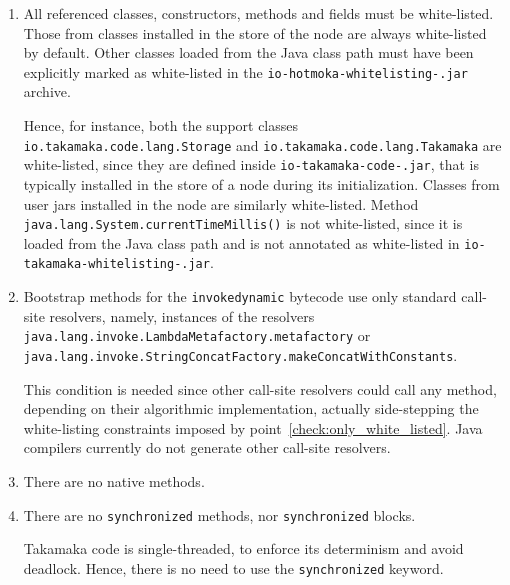 \begin{enumerate}
\begin{commentbox}
that occurs once at its start-up, it is however permitted to install the
runtime of Takamaka (the \texttt{io-takamaka-code-\takamakaVersion{}.jar} archive used in the examples
in the previous chapters).
\end{commentbox}
%
\item\label{check:only_white_listed} All referenced classes, constructors, methods and fields must be
	white-listed.
    Those from classes installed in the store of the node are always white-listed by
    default. Other classes loaded from the Java class path must have been explicitly
    marked as white-listed in the \texttt{io-hotmoka-whitelisting-\hotmokaVersion{}.jar} archive.
%
\begin{commentbox}
Hence, for instance, both the support classes \texttt{io.takamaka.code.lang.Storage}
and \texttt{io.takamaka.code.lang.Takamaka} are white-listed, since they
are defined inside \texttt{io-takamaka-code-\takamakaVersion{}.jar}, that is typically installed in the store of a
node during its initialization. Classes from user
jars installed in the node are similarly white-listed.
Method \texttt{java.lang.System.currentTimeMillis()} is not white-listed,
since it is loaded from the Java class path and is not annotated as white-listed
in \texttt{io-takamaka-whitelisting-\hotmokaVersion{}.jar}.
\end{commentbox}
%
\item\label{check:only_standard_call_sites}
	Bootstrap methods for the \texttt{invokedynamic} bytecode use only standard call-site
    resolvers, namely, instances of the resolvers \texttt{java.lang.invoke.LambdaMetafactory.metafactory}
    or \texttt{java.lang.invoke.StringConcatFactory.makeConcatWithConstants}.
%
\begin{commentbox}
This condition is needed since other call-site resolvers could call any
method, depending on their algorithmic implementation, actually
side-stepping the white-listing constraints imposed by point~\ref{check:only_white_listed}.
Java compilers currently do not generate other call-site resolvers.
\end{commentbox}
%
\item There are no native methods.
\item There are no \texttt{synchronized} methods, nor \texttt{synchronized} blocks.
%
\begin{commentbox}
Takamaka code is single-threaded, to enforce its determinism and avoid deadlock.
Hence, there is no need to use the \texttt{synchronized} keyword.
\end{commentbox}

\end{enumerate}
